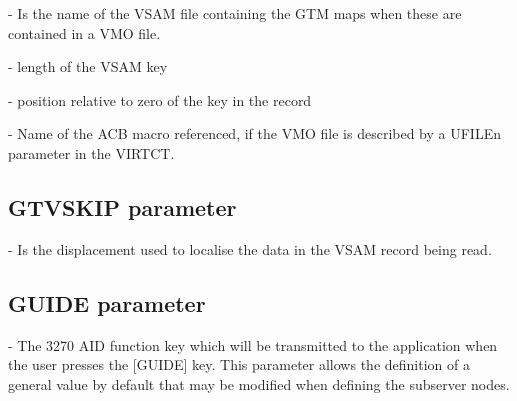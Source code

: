 \documentclass[letterpaper,10pt,english]{sphinxmanual}
\begin{document}
 - Is the name of the VSAM file containing the GTM maps when these are contained in a VMO file.

 - length of the VSAM key

 - position relative to zero of the key in the record

 - Name of the ACB macro referenced, if the VMO file is described by a UFILEn parameter in the VIRTCT.

\ignorespaces 

\subsection{GTVSKIP parameter}
\label{\detokenize{Installation_Guide:gtvskip-parameter}}\label{\detokenize{Installation_Guide:index-74}}
\begin{sphinxVerbatim}[commandchars=\\\{\}]
                
\end{sphinxVerbatim}

 - Is the displacement used to localise the data in the VSAM record being read.

\ignorespaces 

\subsection{GUIDE parameter}
\label{\detokenize{Installation_Guide:guide-parameter}}\label{\detokenize{Installation_Guide:index-75}}
\begin{sphinxVerbatim}[commandchars=\\\{\}]
                  
\end{sphinxVerbatim}

 - The 3270 AID function key which will be transmitted to the application when the user presses the {[}GUIDE{]} key. This parameter allows the definition of a general value by default that may be modified when defining the subserver nodes.
\end{document}
